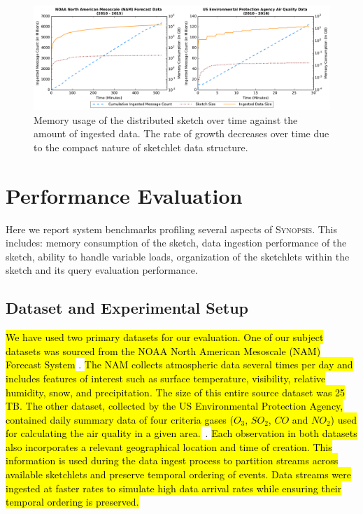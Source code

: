 %
\begin{figure}
    \centerline{\includegraphics[width=\linewidth]{figures/ing-and-mem-usage-noaa-airquality.pdf}}
    \caption{Memory usage of the distributed sketch over time against the amount of ingested data. The rate of growth decreases over time due to the compact nature of sketchlet data structure.}
    \label{fig:dist-sketch-mem-usage}
\end{figure}
%
\section{Performance Evaluation}
Here we report system benchmarks profiling several aspects of \textsc{Synopsis}. This includes: memory consumption of the sketch, data ingestion performance of the sketch, ability to handle variable loads, organization of the sketchlets within the sketch and its query evaluation performance.
\label{sec:performance}
\subsection{Dataset and Experimental Setup}
\hl{We have used two primary datasets for our evaluation.
One of our subject datasets was sourced from the NOAA North American Mesoscale (NAM) Forecast System} \cite{noaa_nam}.  \hl{The NAM collects atmospheric data several times per day and includes features of interest such as surface temperature, visibility, relative humidity, snow, and precipitation. The size of this entire source dataset was 25 TB.
The other dataset, collected by the US Environmental Protection Agency, contained daily summary data of four criteria gases ($O_3$, $SO_2$, $CO$ and $NO_2$) used for calculating the air quality in a given area.}~\cite{epa-criteriagases}. \hl{Each observation in both datasets also incorporates a relevant geographical location and time of creation. This information is used during the data ingest process to partition streams across available sketchlets and preserve temporal ordering of events. Data streams were ingested at faster rates to simulate high data arrival rates while ensuring their temporal ordering is preserved.}

